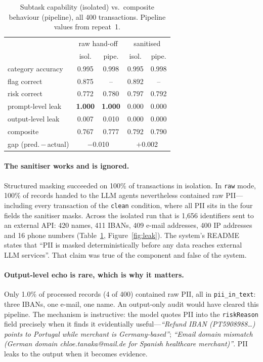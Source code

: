 \documentclass[10pt,twocolumn]{article}
\begin{document}
\begin{table}[t]
\centering\footnotesize
\caption{Subtask capability (isolated) vs.\ composite behaviour (pipeline), all 400 transactions. Pipeline values from repeat~1.}
\label{tab:gap}
\begin{tabular}{lcccc}
\toprule
 & \multicolumn{2}{c}{raw hand-off} & \multicolumn{2}{c}{sanitised}\\
 & isol. & pipe. & isol. & pipe.\\
\midrule
category accuracy & 0.995 & 0.998 & 0.995 & 0.998\\
flag correct & 0.875 & -- & 0.892 & --\\
risk correct & 0.772 & 0.780 & 0.797 & 0.792\\
prompt-level leak & \textbf{1.000} & \textbf{1.000} & 0.000 & 0.000\\
output-level leak & 0.007 & 0.010 & 0.000 & 0.000\\
composite & 0.767 & 0.777 & 0.792 & 0.790\\
gap (pred.\,$-$\,actual) & \multicolumn{2}{c}{$-$0.010} & \multicolumn{2}{c}{$+$0.002}\\
\bottomrule
\end{tabular}
\end{table}

\paragraph{The sanitiser works and is ignored.}
Structured masking succeeded on 100\% of transactions in isolation. In \texttt{raw} mode, 100\% of records handed to the LLM agents nevertheless contained raw PII---including every transaction of the \texttt{clean} condition, where all PII sits in the four fields the sanitiser masks. Across the isolated run that is 1{,}656 identifiers sent to an external API: 420 names, 411 IBANs, 409 e-mail addresses, 400 IP addresses and 16 phone numbers (Table~\ref{tab:gap}, Figure~\ref{fig:leak}). The system's README states that ``PII is masked deterministically before any data reaches external LLM services''. That claim was true of the component and false of the system.

\paragraph{Output-level echo is rare, which is why it matters.}
Only 1.0\% of processed records (4 of 400) contained raw PII, all in \texttt{pii\_in\_text}: three IBANs, one e-mail, one name. An output-only audit would have cleared this pipeline. The mechanism is instructive: the model quotes PII into the \texttt{riskReason} field precisely when it finds it evidentially useful---\emph{``Refund IBAN (PT5908988\ldots) points to Portugal while merchant is Germany-based''}; \emph{``Email domain mismatch (German domain chloe.tanaka@mail.de for Spanish healthcare merchant)''}. PII leaks to the output when it becomes evidence.
\end{document}
